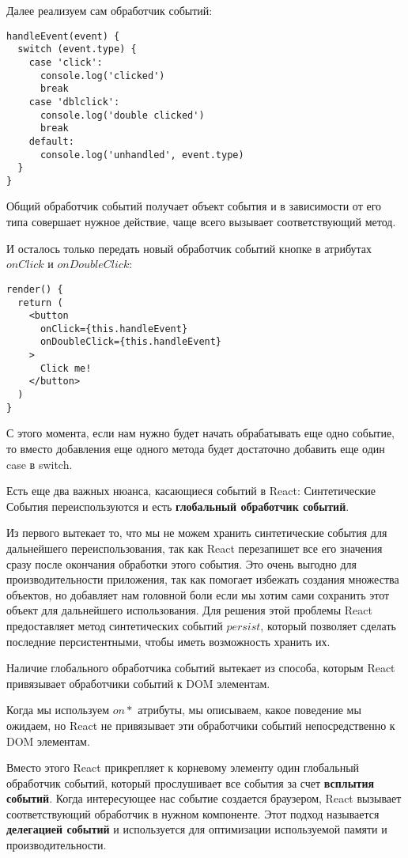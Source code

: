 Далее реализуем сам обработчик событий:

\begin{lstlisting}
handleEvent(event) {
  switch (event.type) {
    case 'click':
      console.log('clicked')
      break
    case 'dblclick':
      console.log('double clicked')
      break
    default:
      console.log('unhandled', event.type)
  } 
}
\end{lstlisting}

Общий обработчик событий получает объект события и в зависимости от его типа совершает нужное действие, чаще всего вызывает соответствующий метод.

И осталось только передать новый обработчик событий кнопке в атрибутах $onClick$ и $onDoubleClick$:

\begin{lstlisting}
render() {
  return (
    <button
      onClick={this.handleEvent}
      onDoubleClick={this.handleEvent}
    >
      Click me!
    </button>
  )
}
\end{lstlisting}

С этого момента, если нам нужно будет начать обрабатывать еще одно событие, то вместо добавления еще одного метода будет достаточно добавить еще один case в switch.

Есть еще два важных нюанса, касающиеся событий в React: Синтетические События переиспользуются и есть \textbf{глобальный обработчик событий}. 

Из первого вытекает то, что мы не можем хранить синтетические события для дальнейшего переиспользования, так как React перезапишет все его значения сразу после окончания обработки этого события. Это очень выгодно для производительности приложения, так как помогает избежать создания множества объектов, но добавляет нам головной боли если мы хотим сами сохранить этот объект для дальнейшего использования. Для решения этой проблемы React предоставляет метод синтетических событий $persist$, который позволяет сделать последние персистентными, чтобы иметь возможность хранить их.

Наличие глобального обработчика событий вытекает из способа, которым React привязывает обработчики событий к DOM элементам.

Когда мы используем $on*$ атрибуты, мы описываем, какое поведение мы ожидаем, но React не привязывает эти обработчики событий непосредственно к DOM элементам.

Вместо этого React прикрепляет к корневому элементу один глобальный обработчик событий, который прослушивает все события за счет \textbf{всплытия событий}. Когда интересующее нас событие создается браузером, React вызывает соответствующий обработчик в нужном компоненте. Этот подход называется \textbf{делегацией событий} и используется для оптимизации используемой памяти и производительности.


